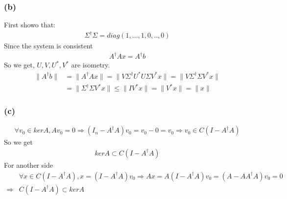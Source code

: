 \documentclass{article}
\begin{document}
\subsubsection*{(b)}
First showo that: 
\begin{equation*}
    \begin{split}
        \Sigma ^ \dagger \Sigma = diag(1, ..., 1, 0, .., 0)
    \end{split}
\end{equation*}
Since the system is consistent
\begin{equation*}
    \begin{split}
        A^\dagger Ax = A^\dagger b 
    \end{split}
\end{equation*}
So we get, $U, V, U^*, V^* $ are isometry.
\begin{equation*}
    \begin{split}
        \|A^\dagger b \| &= \| A^\dagger Ax \| = \|V \Sigma ^ \dagger U^* U \Sigma V^* x\| = \| V \Sigma ^ \dagger \Sigma V^* x\| \\
                        & = \| \Sigma ^ \dagger \Sigma V^*x \| \le \|I V^*x\| = \|V^*x\| = \|x\|
    \end{split}
\end{equation*}

\subsubsection*{(c)}
\begin{equation*}
    \begin{split}
        \forall v_0 \in kerA, Av_0 = 0 \Rightarrow (I_n - A^\dagger A)v_0 = v_0 - 0 = v_0 \Rightarrow v_0 \in C(I - A^\dagger A)
    \end{split}
\end{equation*}
So we get 
\begin{equation*}
    \begin{split}
        kerA \subset C(I - A^\dagger A)
    \end{split}
\end{equation*}
For another side
\begin{equation*}
    \begin{split}
       &\forall x \in C(I - A^\dagger A), x = (I - A^\dagger A)v_0 \Rightarrow Ax = A (I - A^\dagger A)v_0 = (A -  AA^\dagger A)v_0 = 0 \\
        \Rightarrow & C(I - A^\dagger A) \subset kerA 
    \end{split}
\end{equation*}
\end{document}

